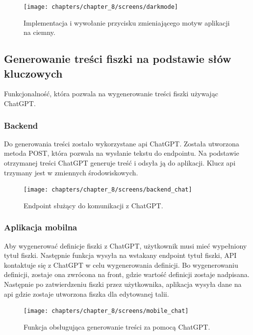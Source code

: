 \begin{figure}[H]
    \centering
    \texttt{[image: chapters/chapter\_8/screens/darkmode]}
    \caption{Implementacja i wywołanie przycisku zmieniającego motyw aplikacji na ciemny.}
    \label{img:darkmode}
\end{figure}

\subsection{Generowanie treści fiszki na podstawie słów kluczowych}
Funkcjonalność, która pozwala na wygenerowanie treści fiszki używając ChatGPT.

\subsubsection{Backend}
Do generowania treści zostało wykorzystane api ChatGPT. Została utworzona metoda POST, która pozwala na wysłanie tekstu do endpointu. Na podstawie otrzymanej treści ChatGPT generuje treść i odsyła ją do aplikacji. Klucz api trzymany jest w zmiennych środowiskowych.

\begin{figure}[H]
    \centering
    \texttt{[image: chapters/chapter\_8/screens/backend\_chat]}
    \caption{Endpoint służący do komunikacji z ChatGPT.}
    \label{img:backend_chat}
\end{figure}

\subsubsection{Aplikacja mobilna}
Aby wygenerować definicje fiszki z ChatGPT, użytkownik musi mieć wypełniony tytuł fiszki. Następnie funkcja wysyła na wstakany endpoint tytuł fiszki, API kontaktuje się z ChatGPT w celu wygenerowania definicji. Bo wygenerowaniu definicji, zostaje ona zwrócona na front, gdzie wartość definicji zostaje nadpisana. Następnie po zatwierdzeniu fiszki przez użytkownika, aplikacja wysyła dane na api gdzie zostaje utworzona fiszka dla edytowanej talii.

\begin{figure}[H]
    \centering
    \texttt{[image: chapters/chapter\_8/screens/mobile\_chat]}
    \caption{Funkcja obsługująca generowanie treści za pomocą ChatGPT.}
    \label{img:mobile_chat_1}
\end{figure}

